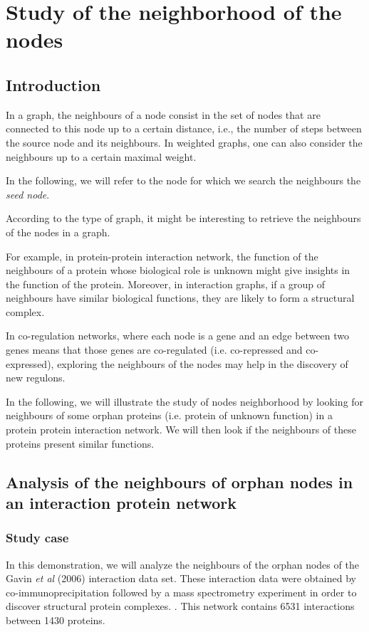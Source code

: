\chapter{Study of the neighborhood of the nodes}

\section{Introduction}
In a graph, the neighbours of a node consist in the set of nodes that are connected
to this node up to a certain distance, i.e., the number of steps
between the source node and its neighbours. In weighted graphs, one can also consider the neighbours up to 
a certain maximal weight.

In the following, we will refer to the node for which we search the neighbours the \textit{seed node}.

According to the type of graph, it might be 
interesting to retrieve the neighbours of the nodes in a graph.

For example, in protein-protein interaction network, the function of the neighbours of a protein whose
biological role is unknown might give insights in the function of the protein.
Moreover, in interaction graphs, if a group of neighbours have similar biological functions, they are likely to
form a structural complex.

In co-regulation networks, where each node is a gene and an edge between two genes means that those genes are
co-regulated (i.e. co-repressed and co-expressed), exploring the neighbours of the nodes may help in the discovery of 
new regulons.

In the following, we will illustrate the study of nodes neighborhood by looking for neighbours of some orphan proteins (i.e. protein of unknown function)  in a protein protein interaction network. We will then look if the neighbours of these proteins present similar functions.

\section{Analysis of the neighbours of orphan nodes in an interaction protein network}
\subsection{Study case}

In this demonstration, we will analyze the neighbours of the orphan nodes of the 
Gavin \textit{et al} (2006) interaction data set. These interaction data were obtained
by co-immunoprecipitation followed by a mass spectrometry experiment in order to
discover structural protein complexes. \cite{Gavin2006}. 
This network contains 6531 interactions between 1430
proteins.

